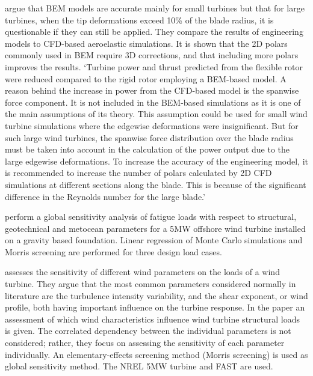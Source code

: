 \documentclass[review]{elsarticle}
\numberwithin{equation}{section}
\numberwithin{equation}{section}
\begin{document}
\cite{Sayed2019} argue that BEM models are accurate mainly for small turbines but that for large turbines, when the tip deformations exceed 10\% of the blade radius, it is questionable if they can still be applied. They compare the results of engineering models to CFD-based aeroelastic simulations. It is shown that the 2D polars commonly used in BEM require 3D corrections, and that including more polars improves the results. `Turbine power and thrust predicted from the flexible rotor were reduced compared to the rigid rotor employing a BEM-based model. A reason behind the increase in power from the CFD-based model is the spanwise force component. It is not included in the BEM-based simulations as it is one of the main assumptions of its theory. This assumption could be used for small wind turbine simulations where the edgewise deformations were insignificant. But for such large wind turbines, the spanwise force distribution over the blade radius must be taken into account in the calculation of the power output due to the large edgewise deformations. To increase the accuracy of the engineering model, it is recommended to increase the number of polars calculated by 2D CFD simulations at different sections along the blade. This is because of the significant difference in the Reynolds number for the large blade.'

\cite{Velarde2019} perform a global sensitivity analysis of fatigue loads with respect to structural, geotechnical and metocean parameters for a 5MW offshore wind turbine installed on a gravity based foundation. Linear regression of Monte Carlo simulations and Morris screening are performed for three design load cases. 

\cite{Robertson2018} assesses the sensitivity of different wind parameters on the loads of a wind turbine. They argue that the most common parameters considered normally in literature are the turbulence intensity variability, and the shear exponent, or wind profile, both having important influence on the turbine response. In the paper an assessment of which wind characteristics influence wind turbine structural loads is given. The correlated dependency between the individual parameters is not considered; rather, they focus on assessing the sensitivity of each parameter individually. An elementary-effects screening method (Morris screening) is used as global sensitivity method. The NREL 5MW turbine and FAST are used.
\end{document}
